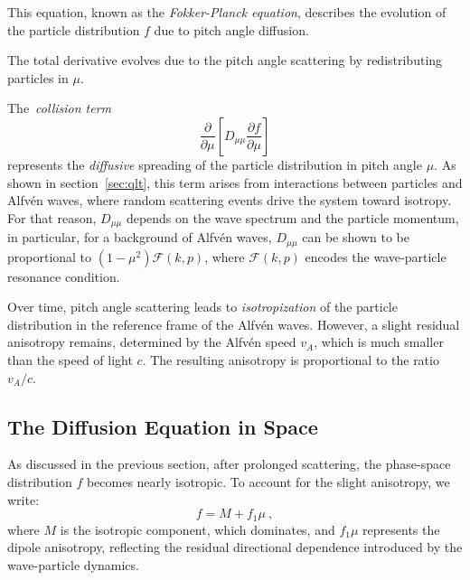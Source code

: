 This equation, known as the \emph{Fokker-Planck equation}, describes the evolution of the particle distribution \( f \) due to pitch angle diffusion. 

{\color{red}The total derivative evolves due to the pitch angle scattering by redistributing particles in \( \mu \)}.

The~\emph{collision term} 
\[
\frac{\partial}{\partial \mu} \left[ D_{\mu\mu} \frac{\partial f}{\partial \mu} \right] 
\]
represents the \emph{diffusive} spreading of the particle distribution in pitch angle \( \mu \). As shown in section~\ref{sec:qlt}, this term arises from interactions between particles and Alfvén waves, where random scattering events drive the system toward isotropy.
%
For that reason, \( D_{\mu\mu} \) depends on the wave spectrum and the particle momentum, in particular, for a background of Alfvén waves, \( D_{\mu\mu} \) can be shown to be proportional to \( (1 - \mu^2) \mathcal F(k, p) \), where \( \mathcal F(k, p) \) encodes the wave-particle resonance condition. 

Over time, pitch angle scattering leads to \emph{isotropization} of the particle distribution in the reference frame of the Alfvén waves. However, a slight residual anisotropy remains, determined by the Alfvén speed \( v_A \), which is much smaller than the speed of light \( c \). The resulting anisotropy is proportional to the ratio \( v_A / c \).


\subsection{The Diffusion Equation in Space}

As discussed in the previous section, after prolonged scattering, the phase-space distribution \( f \) becomes nearly isotropic. To account for the slight anisotropy, we write:
\begin{equation}\label{eq:fmf1}
f = M + f_1 \mu~,
\end{equation}
where \( M \) is the isotropic component, which dominates, and \( f_1 \mu \) represents the dipole anisotropy, reflecting the residual directional dependence introduced by the wave-particle dynamics.

